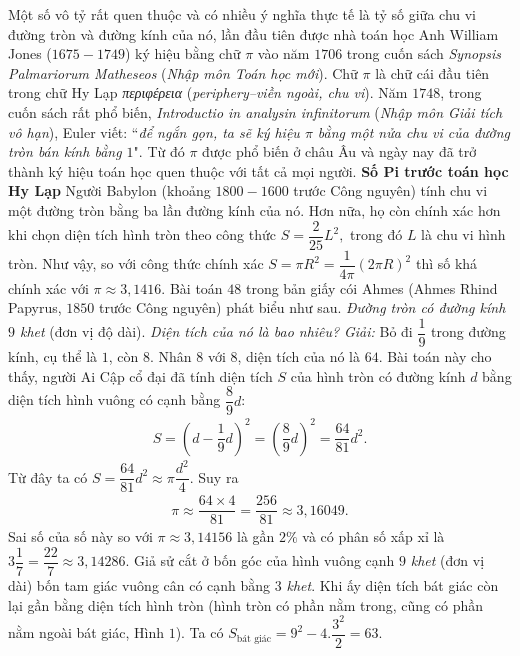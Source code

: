\begin{multicols}{2}
	Một số vô tỷ rất quen thuộc và có nhiều ý nghĩa thực tế là tỷ số giữa chu vi đường tròn và đường kính của nó, lần đầu tiên được nhà toán học Anh William Jones ($1675-1749$) ký hiệu bằng chữ $\pi$ vào năm $1706$  trong cuốn sách \textit{Synopsis Palmariorum Matheseos} (\textit{Nhập môn Toán học mới}). Chữ $\pi$ là chữ cái đầu tiên trong chữ Hy Lạp \textit{περιφέρεια} (\textit{periphery--viền ngoài, chu vi}). Năm $1748$, trong cuốn sách rất phổ biến, \textit{Introductio in analysin infinitorum} (\textit{Nhập môn Giải tích vô hạn}), Euler viết: ``\textit{để ngắn gọn, ta sẽ ký hiệu $\pi$ bằng một nửa chu vi của đường tròn bán kính bằng $1$}". Từ đó $\pi$ được phổ biến ở châu Âu và ngày nay đã trở thành ký hiệu toán học quen thuộc với tất cả mọi người.
	\vskip 0.1cm
	\textbf{\color{lichsutoanhoc}Số Pi trước toán học Hy Lạp}
	\vskip 0.1cm
	Người Babylon (khoảng $1800-1600$ trước Công nguyên) tính chu vi một đường tròn bằng ba lần đường kính của nó. Hơn nữa, họ còn chính xác hơn khi chọn diện tích hình tròn theo công thức $S = \dfrac{2}{{25}}{L^2},$  trong đó $L$  là chu vi hình tròn. Như vậy, so với công thức chính xác $S = \pi {R^2} = \dfrac{1}{{4\pi }}{\left( {2\pi R} \right)^2}$  thì số  khá chính xác với $\pi  \approx 3{,}1416$.
	\vskip 0.1cm
	Bài toán $48$ trong bản giấy cói Ahmes (Ahmes Rhind Papyrus, $1850$ trước Công nguyên) phát biểu như sau. \textit{Đường tròn có đường kính $9$ khet} (đơn vị độ dài). \textit{Diện tích của nó là bao nhiêu?}
	\vskip 0.1cm
	\textit{Giải:} Bỏ đi $\dfrac{1}{9}$ trong đường kính, cụ thể là $1$, còn $8$. Nhân $8$ với $8$, diện tích của nó là $64$.
	\vskip 0.1cm 
	Bài toán này cho thấy, người Ai Cập cổ đại đã tính diện tích  $S$ của hình tròn có đường kính $d$ bằng diện tích hình vuông có cạnh bằng $\dfrac{8}{9}d$: 
	\setlength{\abovedisplayskip}{5pt}
	\setlength{\belowdisplayskip}{5pt}
	\begin{align*}
		S = {\left( {d - \dfrac{1}{9}d} \right)^2} = {\left( {\dfrac{8}{9}d} \right)^2} = \dfrac{{64}}{{81}}{d^2}.
	\end{align*}
	Từ đây ta có  $S = \dfrac{{64}}{{81}}{d^2} \approx  \pi \dfrac{{{d^2}}}{4}$. Suy ra
	\begin{align*}
		\pi  \approx  \dfrac{{64 \times 4}}{{81}} = \dfrac{{256}}{{81}} \approx 3{,}16049.
	\end{align*}
	Sai số của số này so với  $\pi  \approx 3{,}14156$ là gần $2\%$ và có phân số xấp xỉ là $3\dfrac{1}{7} = \dfrac{{22}}{7} \approx 3{,}14286$.
	\vskip 0.1cm 
	Giả sử cắt ở bốn góc của hình vuông cạnh $9$ \textit{khet} (đơn vị dài) bốn tam giác vuông cân có cạnh bằng $3$ \textit{khet}. Khi ấy diện tích bát giác còn lại gần bằng diện tích hình tròn (hình tròn có phần nằm trong, cũng có phần nằm ngoài bát giác, Hình $1$). Ta có ${S_{{\text{bát giác}}}} = {9^2} - 4.\dfrac{{{3^2}}}{2} = 63.$   

\end{multicols}
